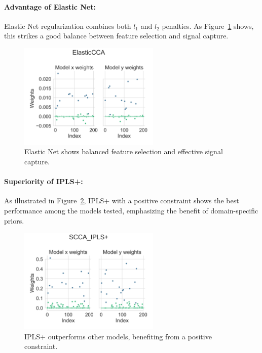 \paragraph{Advantage of Elastic Net:}
Elastic Net regularization combines both $l_1$ and $l_2$ penalties. As Figure~\ref{fig:ElasticNet_weights} shows, this strikes a good balance between feature selection and signal capture.

\begin{figure}[h]
    \centering
    \includegraphics[width=0.6\textwidth]{figures/als/simulated/ElasticCCA_weights.svg}
    \caption{Elastic Net shows balanced feature selection and effective signal capture.}
    \label{fig:ElasticNet_weights}
\end{figure}

\paragraph{Superiority of IPLS+:}
As illustrated in Figure~\ref{fig:IPLS+_weights}, IPLS+ with a positive constraint shows the best performance among the models tested, emphasizing the benefit of domain-specific priors.

\begin{figure}[h]
    \centering
    \includegraphics[width=0.6\textwidth]{figures/als/simulated/SCCA_IPLS_positive_weights.svg}
    \caption{IPLS+ outperforms other models, benefiting from a positive constraint.}
    \label{fig:IPLS+_weights}
\end{figure}

